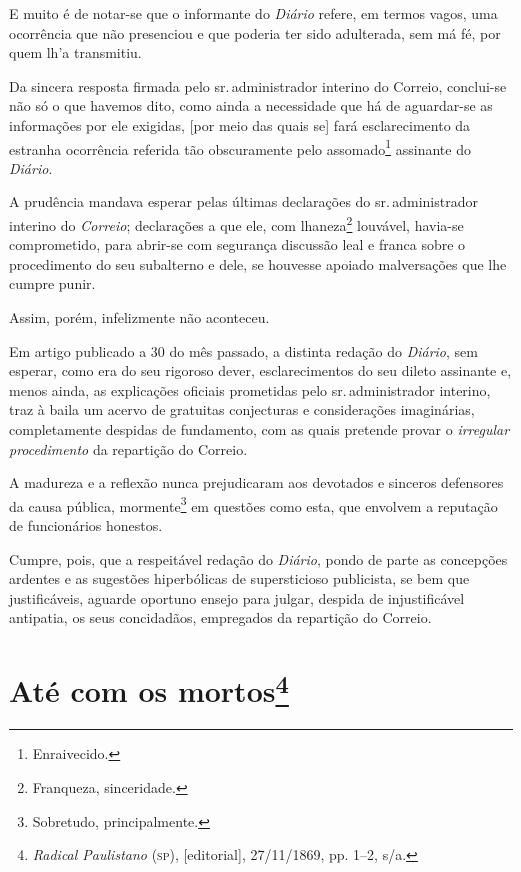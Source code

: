 E muito é de notar-se que o informante do \emph{Diário} refere, em
termos vagos, uma ocorrência que não presenciou e que poderia ter sido
adulterada, sem má fé, por quem lh'a transmitiu.

Da sincera resposta firmada pelo sr.\,administrador interino do Correio,
conclui-se não só o que havemos dito, como ainda a necessidade que há de
aguardar-se as informações por ele exigidas, {[}por meio das quais se{]}
fará esclarecimento da estranha ocorrência referida tão obscuramente
pelo assomado\footnote{Enraivecido.} assinante do \emph{Diário}.

A prudência mandava esperar pelas últimas declarações do sr.\,administrador interino do \emph{Correio}; declarações a que ele, com
lhaneza\footnote{Franqueza, sinceridade.} louvável, havia-se
comprometido, para abrir-se com segurança discussão leal e franca sobre
o procedimento do seu subalterno e dele, se houvesse apoiado
malversações que lhe cumpre punir.

Assim, porém, infelizmente não aconteceu.

Em artigo publicado a 30 do mês passado, a distinta redação do
\emph{Diário}, sem esperar, como era do seu rigoroso dever,
esclarecimentos do seu dileto assinante e, menos ainda, as explicações
oficiais prometidas pelo sr.\,administrador interino, traz à baila um
acervo de gratuitas conjecturas e considerações imaginárias,
completamente despidas de fundamento, com as quais pretende provar o
\emph{irregular procedimento} da repartição do Correio.

A madureza e a reflexão nunca prejudicaram aos devotados e sinceros
defensores da causa pública, mormente\footnote{Sobretudo,
  principalmente.} em questões como esta, que envolvem a reputação de
funcionários honestos.

Cumpre, pois, que a respeitável redação do \emph{Diário}, pondo de parte
as concepções ardentes e as sugestões hiperbólicas de supersticioso
publicista, se bem que justificáveis, aguarde oportuno ensejo para
julgar, despida de injustificável antipatia, os seus concidadãos,
empregados da repartição do Correio.

\chapter{Até com os mortos\footnote{\emph{Radical Paulistano} (\textsc{sp}),
  {[}editorial{]}, 27/11/1869, pp. 1--2, s/a.}}

